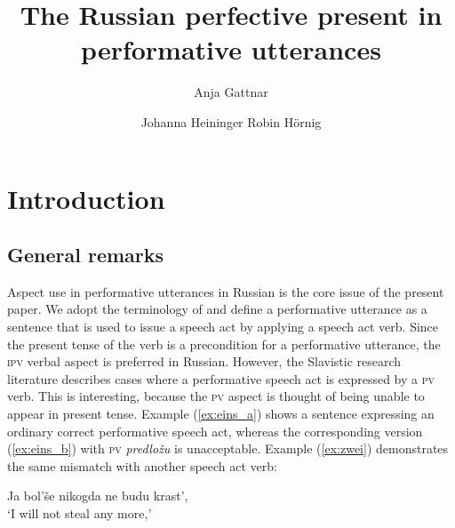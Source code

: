 \documentclass[output=paper,
colorlinks,
citecolor=brown,
newtxmath,
hidelinks
]{langscibook}
\title{The Russian perfective present in performative utterances}
\author{
 Anja Gattnar\affiliation{University of Tübingen}\and 
 Johanna Heininger\affiliation{University of Tübingen}\lastand 
 Robin Hörnig\affiliation{University of Tübingen}
}
\begin{document}
\maketitle
{}
%

\section{Introduction}

\subsection{General remarks}
Aspect use in performative utterances in Russian is the core issue of the present paper. We adopt the terminology of \citet{Eckardt2012} and define a performative utterance as a sentence that is used to issue a speech act by applying a speech act verb. Since the present tense of the verb is a precondition for a performative utterance, the \textsc{ipv} verbal aspect is preferred in Russian. However, the Slavistic research literature describes cases where a performative speech act is expressed by a \textsc{pv} verb. This is interesting, because the \textsc{pv} aspect is thought of being unable to appear in present tense. Example (\ref{ex:eins_a}) shows a sentence expressing an ordinary correct performative speech act, whereas the corresponding version (\ref{ex:eins_b}) with \textsc{pv} \textit{predložu} is unacceptable. Example (\ref{ex:zwei}) demonstrates the same mismatch with another speech act verb:

\ea\label{ex:eins}
           \z
\z

\ea\label{ex:zwei} Ja bol’še nikogda ne budu krast',\\‘I will not steal any more,’
           \z
\z
\end{document}
